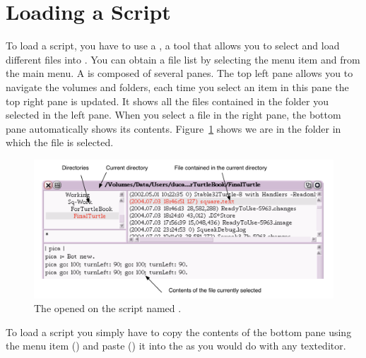 \section{Loading a Script}
To load a script, you have to use a  \fl, a tool that allows you to select and load different files into \sq. You can obtain a file list by selecting the menu item  and  from the main menu.  A \fl is composed of several panes. The top left pane allows you to navigate the volumes and folders, each time you select an item in this pane the top right pane is updated. It shows all the files contained in the folder you selected in the left pane. When you select a file in the right pane, the bottom pane automatically shows its contents. Figure~\ref{fig:filelistOpen} shows we are in  the folder  in  which  the file  is selected. 




\begin{figure}[h]\begin{center}
\includegraphics[width=12cm]{filelistOpenAnnotated}
\caption{The \fl opened on the script named .\label{fig:filelistOpen}}\end{center}
\end{figure}

To load a script you simply have to copy  the contents of the bottom pane using the menu item () and paste  () it into the \tw as you would do with any texteditor.   









